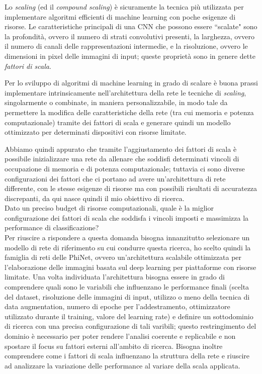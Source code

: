 Lo \textit{scaling} (ed il \textit{compound scaling}) è sicuramente la tecnica più utilizzata per implementare algoritmi efficienti di machine learning con poche esigenze di risorse. Le caratteristiche principali di una CNN che possono essere ``scalate" sono la profondità, ovvero il numero di strati convolutivi presenti, la larghezza, ovvero il numero di canali delle rappresentazioni intermedie, e la risoluzione, ovvero le dimensioni in pixel delle immagini di input; queste proprietà sono in genere dette \textit{fattori di scala}.

Per lo sviluppo di algoritmi di machine learning in grado di scalare è buona prassi implementare intrinsicamente nell'architettura della rete le tecniche di \textit{scaling}, singolarmente o combinate, in maniera personalizzabile, in modo tale da permettere la modifica delle caratteristiche della rete (tra cui memoria e potenza computazionale) tramite dei fattori di scala e generare quindi un modello ottimizzato per determinati dispositivi con risorse limitate. 

Abbiamo quindi appurato che tramite l'aggiustamento dei fattori di scala è possibile inizializzare una rete da allenare che soddisfi determinati vincoli di occupazione di memoria e di potenza computazionale; tuttavia ci sono diverse configurazioni dei fattori che ci portano ad avere un'architettura di rete differente, con le stesse esigenze di risorse ma con possibili risultati di accuratezza discrepanti, da qui nasce quindi il mio obiettivo di ricerca. \\

Dato un preciso budget di risorse computazionali, quale è la miglior configurazione dei fattori di scala che soddisfa i vincoli imposti e massimizza la performance di classificazione? \\

Per riuscire a rispondere a questa domanda bisogna innanzitutto selezionare un modello di rete di riferimento su cui condurre questa ricerca, ho scelto quindi la famiglia di reti delle PhiNet\cite{10.1145/3510832}, ovvero un'architettura scalabile ottimizzata per l'elaborazione delle immagini basata sul deep learning per piattaforme con risorse limitate.
Una volta individuata l'architettura bisogna essere in grado di comprendere quali sono le variabili che influenzano le performance finali (scelta del dataset, risoluzione delle immagini di input, utilizzo o meno della tecnica di data augmentation,  numero di epoche per l'addestramento, ottimizzatore utilizzato durante il training, valore del learning rate) e definire un sottodominio di ricerca con una precisa configurazione di tali varibili; questo restringimento del dominio è necessario per poter rendere l'analisi coerente e replicabile e non spostare il focus su fattori esterni all'ambito di ricerca. Bisogna inoltre comprendere come i fattori di scala influenzano la struttura della rete e riuscire ad analizzare la variazione delle performance al variare della scala applicata.


